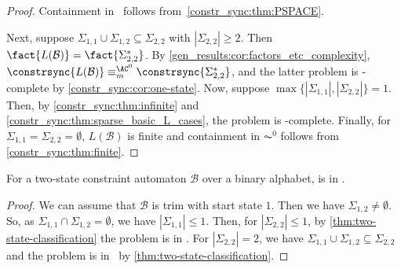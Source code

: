 \begin{proof}
    Containment in \PSPACE\  follows from~\cref{constr_sync:thm:PSPACE}.    
    
    Next, suppose $\Sigma_{1,1} \cup \Sigma_{1,2} \subseteq \Sigma_{2,2}$
    with $|\Sigma_{2,2}| \ge 2$.
    Then 
    $\fact{L(\mathcal B)} = \fact{\Sigma_{2,2}^*}$.
    By \cref{gen_results:cor:factors_etc_complexity}, 
    $\constrsync{L(\mathcal B)} \equiv_m^{\AC^0} \constrsync{\Sigma_{2,2}^*}$,
    and the latter problem is \NL-complete 
    by \cref{constr_sync:cor:one-state}. 
    Now, suppose $\max\{ |\Sigma_{1,1}|, |\Sigma_{2,2}| \} = 1$.
    Then, by \cref{constr_sync:thm:infinite}  and 
    \cref{constr_sync:thm:sparse_basic_L_cases},
    the problem is \LOGSPACE-complete.
    Finally, for $\Sigma_{1,1} = \Sigma_{2,2} = \emptyset$,
    $L(\mathcal B)$ is finite
    and containment in $\AC^0$ follows from \cref{constr_sync:thm:finite}. 	
\end{proof}


\begin{corollary}
	\label{constr_sync:cor:two-state_binary}
For a two-state constraint automaton $\mathcal B$
over a binary alphabet, 
is in \NL.
\end{corollary}
\begin{proof}
	We can assume that $\mathcal B$ is trim with start state $1$. Then we have $\Sigma_{1,2} \ne \emptyset$.
	So, as $\Sigma_{1,1} \cap \Sigma_{1,2} = \emptyset$,
	we have  $|\Sigma_{1,1}|\le 1$. Then, for $|\Sigma_{2,2}| \le 1$,
	by \cref{thm:two-state-classification} 
	the problem is in \LOGSPACE. 
	For $|\Sigma_{2,2}| = 2$,
	we have $\Sigma_{1,1} \cup \Sigma_{1,2}\subseteq \Sigma_{2,2}$
	and the problem is in \NL\ 
	by \cref{thm:two-state-classification}.
\end{proof}

